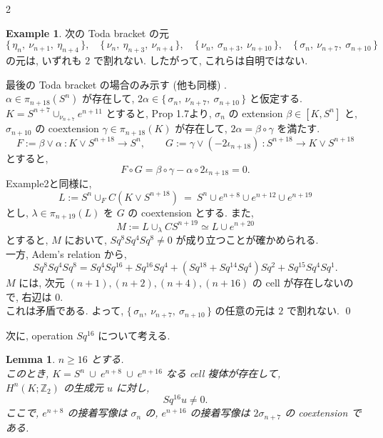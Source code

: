 \documentclass[10pt, leqno]{ltjsarticle}
\newcommand{\toda}[1]{\{\,#1\,\}}              %
\newcommand{\pis}[2]{\pi_{#1}(#2)}       %
\newcommand{\z}{\mathbb{Z}}
\newcommand{\sq}[1]{Sq^{#1}}
\numberwithin{equation}{section}
\theoremstyle{plain}
\newtheorem{lemma}[theorem]{Lemma}
\theoremstyle{definition}
\newtheorem{example}[]{Example}
\theoremstyle{remark}
\begin{document}
\begin{paracol}{2}

\begin{example}
次の Toda bracket の元
\[
\toda{\eta_n,\ \nu_{n+1},\ \eta_{n+4}},\quad
\toda{\nu_n,\ \eta_{n+3},\ \nu_{n+4}},\quad
\toda{\nu_n,\ \sigma_{n+3},\ \nu_{n+10}},\quad
\toda{\sigma_n,\ \nu_{n+7},\ \sigma_{n+10}}
\]
の元は, いずれも $2$ で割れない. したがって, これらは自明ではない. 
\end{example}

最後の Toda bracket の場合のみ示す (他も同様) . \\
$\alpha\in\pis{n+18}{S^n}$ が存在して,
$2\alpha\in \toda{\sigma_n,\ \nu_{n+7},\ \sigma_{n+10}}$
と仮定する. \\
$K=S^{n+7}\cup_{\nu_{n+7}}e^{n+11}$ 
とすると, Prop 1.7より, 
$\sigma_n$ の extension  $\beta\in [K, S^n]$ と,\\
$\sigma_{n+10}$ の coextension  $\gamma\in\pis{n+18}{K}$
が存在して, \(2\alpha = \beta\circ\gamma\) を満たす.
\[
F:=\beta\vee \alpha\ :K\vee S^{n+18}\to S^n,\qquad
G:=\gamma\vee(-2\iota_{n+18})\ : S^{n+18}\to K\vee S^{n+18}
\]
とすると,
\[
F\circ G= \beta\circ\gamma - \alpha\circ 2\iota_{n+18} = 0.
\]
Example2と同様に,
\[
L := S^n\cup_F C(K\vee S^{n+18})\ 
= \ S^n\cup e^{n+8}\cup e^{n+12}\cup e^{n+19}
\]
とし, $\lambda\in\pis{n+19}{L}$ を $G$ の coextension とする.
また, 
\[
M := L\cup_\lambda CS^{n+19}\simeq L\cup e^{n+20}
\]
とすると, 
$M$ において, $Sq^8 Sq^4 Sq^8 \ne 0$ が成り立つことが確かめられる. \\
一方, Adem's relation から,
\[
Sq^8 Sq^4 Sq^8 = Sq^4 Sq^{16} 
+ Sq^{16}Sq^4
+ (Sq^{18} + Sq^{14} Sq^4) Sq^2 + Sq^{15} Sq^4 Sq^1 .
\]
$M$ には, 
次元 $(n+1),(n+2),(n+4),(n+16)$ の cell が存在しないので, 右辺は $0$. \\
これは矛盾である. 
よって, $\toda{\sigma_n,\ \nu_{n+7},\ \sigma_{n+10}}$ の任意の元は
$2$ で割れない. 
\qed


\bigskip
次に, operation \(\sq{16}\) について考える.
\begin{lemma}\label{lem:8.3}
$n\ge16$ とする. \\このとき,
\(
K=S^n\ \cup\ e^{n+8}\ \cup\ e^{n+16}
\)
なる \textnormal{cell} 複体が存在して, \\
$H^n(K;\z_2)$ の生成元 $u$ に対し,
\[
Sq^{16}u\ne0.
\]
ここで, 
\(e^{n+8}\) の接着写像は \(\sigma_n\) の,
\(e^{n+16}\) の接着写像は \(2\sigma_{n+7}\) の \textnormal{coextension} である.
\end{lemma}


\end{paracol}
\end{document}
